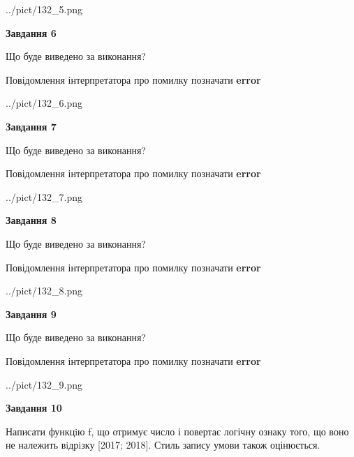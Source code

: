 \documentclass[12pt, ukrainian]{article}
\begin{document}
{\begin {large}
\begin{center}
	{../pict/132_5.png}
\end{center}
\newpage

{\begin {center}\textbf{Завдання 6}\end {center}}\par
Що буде виведено за виконання? \par
Повідомлення інтерпретатора про помилку позначати \textbf{error}

\begin{center}
	{../pict/132_6.png}
\end{center}
\newpage

{\begin {center}\textbf{Завдання 7}\end {center}}\par
Що буде виведено за виконання? \par
Повідомлення інтерпретатора про помилку позначати \textbf{error}

\begin{center}
	{../pict/132_7.png}
\end{center}
\newpage

{\begin {center}\textbf{Завдання 8}\end {center}}\par
Що буде виведено за виконання? \par
Повідомлення інтерпретатора про помилку позначати \textbf{error}

\begin{center}
	{../pict/132_8.png}
\end{center}
\newpage

{\begin {center}\textbf{Завдання 9}\end {center}}\par
Що буде виведено за виконання? \par
Повідомлення інтерпретатора про помилку позначати \textbf{error}

\begin{center}
	{../pict/132_9.png}
\end{center}
\newpage

{\begin {center}\textbf{Завдання 10}\end {center}}\par

Написати функцiю f, що отримує число і повертає логічну ознаку того, що воно не належить вiдрiзку [2017; 2018]. Стиль запису умови також оцінюється.\par
\newpage

\end {large}}
\end{document}

